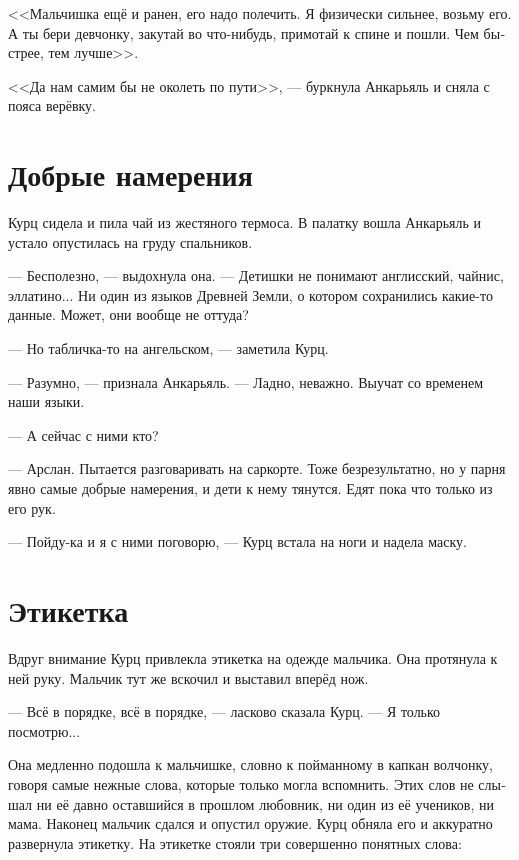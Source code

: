 \documentclass[a4paper,10pt,fleqn]{book}\usepackage{polyglossia}\setdefaultlanguage[babelshorthands=true]{russian}\setotherlanguage{english}\defaultfontfeatures{Ligatures=TeX,Mapping=tex-text}\usepackage{xcolor}\newcommand{\ml}[3]{#2}
\begin{document}
<<Мальчишка ещё и ранен, его надо полечить.
Я физически сильнее, возьму его.
А ты бери девчонку, закутай во что-нибудь, примотай к спине и пошли.
Чем быстрее, тем лучше>>.

<<Да нам самим бы не околеть по пути>>, --- буркнула Анкарьяль и сняла с пояса верёвку.

\section{Добрые намерения}

Курц сидела и пила чай из жестяного термоса.
В палатку вошла Анкарьяль и устало опустилась на груду спальников.

--- Бесполезно, --- выдохнула она.
\ml{$0$}
{--- Детишки не понимают англисский, чайнис, эллатино...}
{``The children don't speak Englis, Chainis, Ellatino ....}
Ни один из языков Древней Земли, о котором сохранились какие-то данные.
Может, они вообще не оттуда?

\ml{$0$}
{--- Но табличка-то на ангельском, --- заметила Курц.}
{``But that plate is written in Engels,'' Kurz noted.}

\ml{$0$}
{--- Разумно, --- признала Анкарьяль.}
{``Makes sense,'' Angaralle admitted.}
--- Ладно, неважно.
Выучат со временем наши языки.

--- А сейчас с ними кто?

\ml{$0$}
{--- Арслан.}
{``Arslan.}
\ml{$0$}
{Пытается разговаривать на саркорте.}
{Trying to speak Sarqort to them.}
\ml{$0$}
{Тоже безрезультатно, но у парня явно самые добрые намерения, и дети к нему тянутся.}
{Result is the same, but the guy apparently has the best intentions for them, and the children reciprocate.}
\ml{$0$}
{Едят пока что только из его рук.}
{Thus far, they take food from his hands only.''}

--- Пойду-ка и я с ними поговорю, --- Курц встала на ноги и надела маску.

\section{Этикетка}

Вдруг внимание Курц привлекла этикетка на одежде мальчика.
Она протянула к ней руку.
Мальчик тут же вскочил и выставил вперёд нож.

--- Всё в порядке, всё в порядке, --- ласково сказала Курц.
--- Я только посмотрю...

Она медленно подошла к мальчишке, словно к пойманному в капкан волчонку, говоря самые нежные слова, которые только могла вспомнить.
Этих слов не слышал ни её давно оставшийся в прошлом любовник, ни один из её учеников, ни мама.
Наконец мальчик сдался и опустил оружие.
Курц обняла его и аккуратно развернула этикетку.
На этикетке стояли три совершенно понятных слова:
\end{document}
